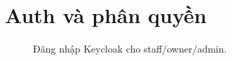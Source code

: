\section{Auth và phân quyền}


\begin{figure}[htbp]
\centering
{}
\caption{\screenshotcaptionprefix Đăng nhập Keycloak cho staff/owner/admin.\screenshotcaptionsuffix}
\label{fig:appendix-a-auth-login}
\end{figure}
